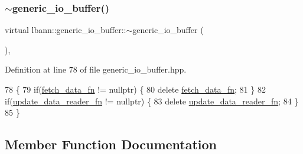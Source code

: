 \subsubsection{\texorpdfstring{$\sim$generic\+\_\+io\+\_\+buffer()}{~generic\_io\_buffer()}}
{\footnotesize\ttfamily virtual lbann\+::generic\+\_\+io\+\_\+buffer\+::$\sim$generic\+\_\+io\+\_\+buffer (\begin{DoxyParamCaption}{ }\end{DoxyParamCaption})\hspace{0.3cm}{\ttfamily [inline]}, {\ttfamily [virtual]}}



Definition at line 78 of file generic\+\_\+io\+\_\+buffer.\+hpp.


\begin{DoxyCode}
78                                \{
79     \textcolor{keywordflow}{if}(\hyperlink{classlbann_1_1generic__io__buffer_a267170b4fd11dc60c782a9cb2b7b06cc}{fetch\_data\_fn} != \textcolor{keyword}{nullptr}) \{
80       \textcolor{keyword}{delete} \hyperlink{classlbann_1_1generic__io__buffer_a267170b4fd11dc60c782a9cb2b7b06cc}{fetch\_data\_fn};
81     \}
82     \textcolor{keywordflow}{if}(\hyperlink{classlbann_1_1generic__io__buffer_a031eda7559a9e241afb3958b56088560}{update\_data\_reader\_fn} != \textcolor{keyword}{nullptr}) \{
83       \textcolor{keyword}{delete} \hyperlink{classlbann_1_1generic__io__buffer_a031eda7559a9e241afb3958b56088560}{update\_data\_reader\_fn};
84     \}
85   \}
\end{DoxyCode}


\subsection{Member Function Documentation}
\mbox{\label{classlbann_1_1generic__io__buffer_a4c71135fada7f0da0b315d538d327e59}} 
